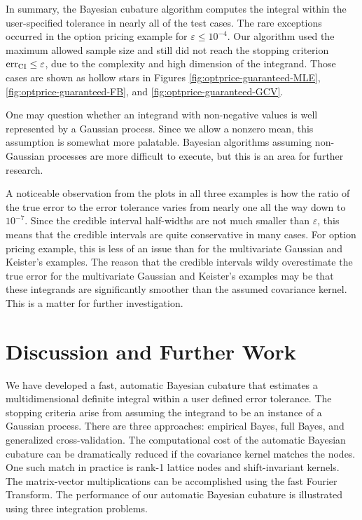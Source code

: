 \documentclass{svjour3}                     %
\newcommand{\err}{\textup{err}}
\begin{document}
In summary, the Bayesian cubature algorithm computes the integral within the user-specified tolerance in nearly all of the test cases.  The rare exceptions occurred in the option pricing example for $\varepsilon \le 10^{-4}$. Our algorithm used the maximum allowed sample size and still did not reach the stopping criterion $\err_{\textup{CI}} \leq \varepsilon$, due to the complexity and high dimension of the integrand. Those cases are shown as hollow stars in Figures \ref{fig:optprice-guaranteed-MLE}, \ref{fig:optprice-guaranteed-FB}, and 
\ref{fig:optprice-guaranteed-GCV}.

One may question whether an integrand with non-negative values is well represented by a Gaussian process.  Since we allow a nonzero mean, this assumption is somewhat more palatable. Bayesian algorithms assuming non-Gaussian processes are more difficult to execute, but this is an area for further research.

A noticeable observation from the plots in all three examples is how the ratio of the true error to the error tolerance varies from nearly one all the way down to $10^{-7}$.  Since the credible interval half-widths are not much smaller than $\varepsilon$, this means that the credible intervals are quite conservative in many cases.  For option pricing example, this is less of an issue than for the multivariate Gaussian and Keister's examples. The reason that the credible intervals wildy overestimate the true error for the multivariate Gaussian and Keister's examples may be that these integrands are significantly smoother than the assumed covariance kernel.  This is a matter for further investigation.




\section{Discussion and Further Work}

We have developed a fast, automatic Bayesian cubature that estimates a multidimensional definite integral within a user defined error tolerance.  The stopping criteria arise from assuming the integrand to be an instance of a Gaussian process. There are three approaches:  empirical Bayes, full Bayes, and generalized cross-validation.  The computational cost of the automatic Bayesian cubature can be dramatically reduced if the covariance kernel matches the nodes.  One such match in practice is rank-1 lattice nodes and shift-invariant kernels.  The matrix-vector multiplications can be accomplished using the fast Fourier Transform.  The performance of our automatic Bayesian cubature is illustrated using three integration problems.  
\end{document}
